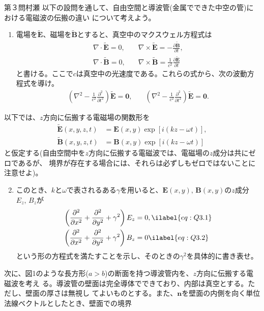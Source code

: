 \begin{question}{第３問}{村瀬}
以下の設問を通して、自由空間と導波管(金属でできた中空の管)における電磁波の伝搬の違い
について考えよう。
\def\tbE{\tilde{\bm{E}}}
\def\tbB{\tilde{\bm{B}}}
\begin{enumerate}
\item
  電場を$\tbE$、磁場を$\tbB$とすると、真空中のマクスウェル方程式は
  \begin{align*}
    \nabla\cdot\tbE = 0, &\quad \nabla\times\tbE = -\frac{\partial\tbB}{\partial t},\\
    \nabla\cdot\tbB = 0, &\quad \nabla\times\tbB = \frac1{c^2}\frac{\partial\tbE}{\partial t}
  \end{align*}
  と書ける。ここで$c$は真空中の光速度である。これらの式から、次の波動方程式を導け。
  \begin{align*}
    \left(\nabla^2 -\frac1{c^2}\frac{\partial^2}{\partial t^2}\right)\tbE = \bm{0}, \quad &
    \left(\nabla^2 -\frac1{c^2}\frac{\partial^2}{\partial t^2}\right)\tbE = \bm{0}.
  \end{align*}
\end{enumerate}
以下では、$z$方向に伝搬する電磁場の関数形を
\begin{align*}
  \tbE(x,y,z,t) &= \bm{E}(x,y) \exp[i(kz-\omega t)],\\
  \tbB(x,y,z,t) &= \bm{B}(x,y) \exp[i(kz-\omega t)]
\end{align*}
と仮定する(自由空間中を$z$方向に伝搬する電磁波では、電磁場の$z$成分は共にゼロであるが、
境界が存在する場合には、それらは必ずしもゼロではないことに注意せよ)。
\begin{enumerate}
\setcounter{enumi}{1}
\item
  このとき、$k$と$\omega$で表されるある$\gamma$を用いると、$\bm{E}(x,y),\,\bm{B}(x,y)$の$z$成分$E_z,\,B_z$が
  \begin{align}
    \left(\frac{\partial^2}{\partial x^2} + \frac{\partial^2}{\partial y^2} + \gamma^2\right) E_z&= 0, \ilabel{eq:Q3.1}\\
    \left(\frac{\partial^2}{\partial x^2} + \frac{\partial^2}{\partial y^2} + \gamma^2\right) B_z &= 0 \ilabel{eq:Q3.2}
  \end{align}
  という形の方程式を満たすことを示し、そのときの$\gamma^2$を具体的に書き表せ。
\end{enumerate}
次に、図1のような長方形($a>b$)の断面を持つ導波管内を、$z$方向に伝搬する電磁波を考え
る。導波管の壁面は完全導体でできており、内部は真空とする。ただし、壁面の厚さは無視し
てよいものとする。また、$\bm{n}$を壁面の内側を向く単位法線ベクトルとしたとき、壁面での境界

\end{question}
